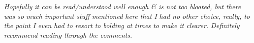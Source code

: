 {\em Hopefully it can be read/understood well enough & is not too bloated, but there was so much important stuff mentioned here that I had no other choice, really, to the point I even had to resort to bolding at times to make it clearer. Definitely recommend reading through the comments.}

\stopsectionlevel

\stopsectionlevel
